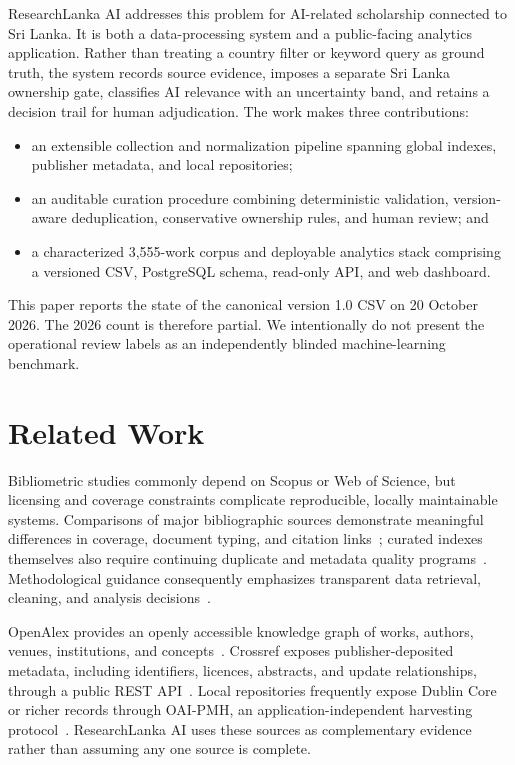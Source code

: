 \documentclass[conference]{IEEEtran}
\begin{document}
ResearchLanka AI addresses this problem for AI-related scholarship connected to Sri Lanka. It is both a data-processing system and a public-facing analytics application. Rather than treating a country filter or keyword query as ground truth, the system records source evidence, imposes a separate Sri Lanka ownership gate, classifies AI relevance with an uncertainty band, and retains a decision trail for human adjudication. The work makes three contributions:
\begin{itemize}
  \item an extensible collection and normalization pipeline spanning global indexes, publisher metadata, and local repositories;
  \item an auditable curation procedure combining deterministic validation, version-aware deduplication, conservative ownership rules, and human review; and
  \item a characterized 3,555-work corpus and deployable analytics stack comprising a versioned CSV, PostgreSQL schema, read-only API, and web dashboard.
\end{itemize}

This paper reports the state of the canonical version 1.0 CSV on 20 October 2026. The 2026 count is therefore partial. We intentionally do not present the operational review labels as an independently blinded machine-learning benchmark.

\section{Related Work}
Bibliometric studies commonly depend on Scopus or Web of Science, but licensing and coverage constraints complicate reproducible, locally maintainable systems. Comparisons of major bibliographic sources demonstrate meaningful differences in coverage, document typing, and citation links~\cite{visser2021comparison}; curated indexes themselves also require continuing duplicate and metadata quality programs~\cite{baas2020scopus}. Methodological guidance consequently emphasizes transparent data retrieval, cleaning, and analysis decisions~\cite{donthu2021bibliometric}.

OpenAlex provides an openly accessible knowledge graph of works, authors, venues, institutions, and concepts~\cite{priem2022openalex}. Crossref exposes publisher-deposited metadata, including identifiers, licences, abstracts, and update relationships, through a public REST API~\cite{crossrefapi}. Local repositories frequently expose Dublin Core or richer records through OAI-PMH, an application-independent harvesting protocol~\cite{oaipmh}. ResearchLanka AI uses these sources as complementary evidence rather than assuming any one source is complete.
\end{document}
